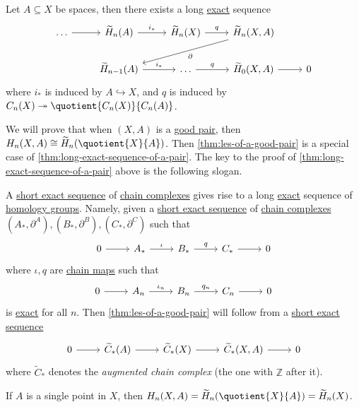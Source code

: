 \begin{theorem}\label{thm:long-exact-sequence-of-a-pair}
	Let \(A \subseteq X\) be spaces, then there exists a long \hyperref[def:exact]{exact} sequence
	\[
		\begin{tikzcd}
			{\ldots} & {\widetilde{H}_n(A)} & {\widetilde{H}_n(X)} & {\widetilde{H}_n(X, A)} \\
			& {\widetilde{H}_{n-1}(A)} & \ldots & {\widetilde{H}_{0}(X, A)} & 0
			\arrow[from=1-1, to=1-2]
			\arrow["{i_\ast}", from=1-2, to=1-3]
			\arrow["q", from=1-3, to=1-4]
			\arrow[from=2-4, to=2-5]
			\arrow["{q}", from=2-3, to=2-4]
			\arrow["{i_\ast}", from=2-2, to=2-3]
			\arrow["{\partial}", from=1-4, to=2-2]
		\end{tikzcd}
	\]
	where \(i_\ast\) is induced by \(A\hookrightarrow X\), and \(q\) is induced by \(C_{n} (X)\twoheadrightarrow \quotient{C_{n} (X)}{C_{n} (A)}\).
\end{theorem}
We will prove that when \((X, A)\) is a \hyperref[def:good-pair]{good pair}, then \(H_n(X, A) \cong \widetilde{H}_n(\quotient{X}{A})\). Then \autoref{thm:les-of-a-good-pair}
is a special case of \autoref{thm:long-exact-sequence-of-a-pair}. The key to the proof of \autoref{thm:long-exact-sequence-of-a-pair} above is the following slogan.

\begin{remark}
	A \hyperref[def:short-exact-sequence]{short exact sequence} of \hyperref[def:chain-complex]{chain complexes} gives rise to a long \hyperref[def:exact]{exact} sequence
	of \hyperref[def:homology-group]{homology groups}. Namely, given a \hyperref[def:short-exact-sequence]{short exact sequence} of \hyperref[def:chain-complex]{chain complexes}
	\((A_\ast, \partial^A), (B_\ast, \partial^B), (C_\ast, \partial^C)\) such that
	\[
		\begin{tikzcd}
			0 & {A_\ast} & {B_\ast} & {C_\ast} & 0
			\arrow[from=1-1, to=1-2]
			\arrow["\iota", from=1-2, to=1-3]
			\arrow["q", from=1-3, to=1-4]
			\arrow[from=1-4, to=1-5]
		\end{tikzcd}
	\]
	where \(\iota , q\) are \hyperref[def:chain-map]{chain maps} such that
	\[
		\begin{tikzcd}
			0 & {A_n} & {B_n} & {C_n} & 0
			\arrow[from=1-1, to=1-2]
			\arrow["\iota_{n}", from=1-2, to=1-3]
			\arrow["q_{n}", from=1-3, to=1-4]
			\arrow[from=1-4, to=1-5]
		\end{tikzcd}
	\]
	is \hyperref[def:exact]{exact} for all \(n\).
	Then \autoref{thm:les-of-a-good-pair} will
	follow from a \hyperref[def:short-exact-sequence]{short exact sequence}
	\[
		\begin{tikzcd}
			0 & {\widetilde{C}_\ast(A)} & {\widetilde{C}_\ast(X)} & {\widetilde{C}_\ast(X, A)} & 0
			\arrow[from=1-1, to=1-2]
			\arrow[from=1-2, to=1-3]
			\arrow[from=1-3, to=1-4]
			\arrow[from=1-4, to=1-5]
		\end{tikzcd}
	\]
	where \(\widetilde{C}_\ast\) denotes the \emph{augmented chain complex} (the one with \(\mathbb{Z}\) after it).
\end{remark}

\begin{exercise}
	If \(A\) is a single point in \(X\), then \(H_n(X, A) = \widetilde{H}_n(\quotient{X}{A}) = \widetilde{H}_n(X)\).
\end{exercise}